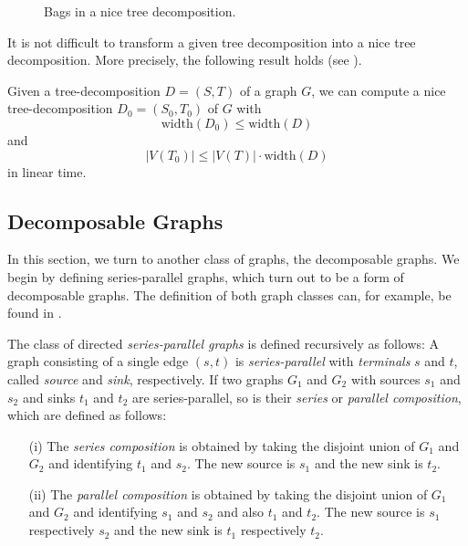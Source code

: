 \begin{figure}[H]
\begin{minipage}[t]{.49\linewidth}
	\end{minipage}%
	\caption{Bags in a nice tree decomposition.}
	\label{fig:nicetreedecompbags}
\end{figure}

It is not difficult to transform a given tree decomposition into a nice tree decomposition. More precisely, the following result holds (see \cite{Kloks94}).

\begin{lemma}
	Given a tree-decomposition $D = (S, T)$ of a graph $G$, we can compute a nice tree-decomposition
	$D_0 = (S_0, T_0)$ of $G$ with
	$$\mathrm{width}(D_0) \leq \mathrm{width}(D)$$
	and
	$$|V(T_0)| \leq |V(T)| \cdot \mathrm{width}(D)$$
	in linear time.
\end{lemma}

\subsection{Decomposable Graphs}
\label{sec:treewidth:decompgraphs}

In this section, we turn to another class of graphs, the decomposable graphs. We begin by defining series-parallel graphs, which turn out to be a form of decomposable graphs. The definition of both graph classes can, for example, be found in \cite{BLW87}.

\begin{definition}
	\label{def:spg}
	The class of directed \textit{series-parallel graphs} is defined recursively as follows: A graph consisting of a single edge $(s, t)$ is \textit{series-parallel} with \textit{terminals} $s$ and $t$, called \textit{source} and \textit{sink}, respectively. If two graphs $G_1$ and $G_2$ with sources $s_1$ and $s_2$ and sinks $t_1$ and $t_2$ are series-parallel, so is their \textit{series} or \textit{parallel composition}, which are defined as follows:
	\begin{itemize}
		\item[(i)] The \textit{series composition} is obtained by taking the disjoint union of $G_1$ and $G_2$ and identifying $t_1$ and $s_2$. The new source is $s_1$ and the new sink is $t_2$.
		\item[(ii)] The \textit{parallel composition} is obtained by taking the disjoint union of $G_1$ and $G_2$ and identifying $s_1$ and $s_2$ and also $t_1$ and $t_2$. The new source is $s_1$ respectively $s_2$ and the new sink is $t_1$ respectively $t_2$.
    \end{itemize}
\end{definition}

